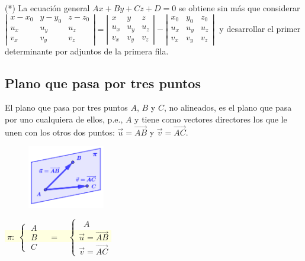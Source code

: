 \vspace{1mm} \noindent (*) \small{\textcolor{gris}{La ecuación general $Ax+By+Cz+D=0$ se obtiene sin más que considerar $\left| \begin{matrix} x-x_0&y-y_0&z-z_0\\u_x&u_y&u_z\\v_x&v_y&v_z  \end{matrix} \right|=\left| \begin{matrix} x&y&z\\u_x&u_y&u_z\\v_x&v_y&v_z  \end{matrix} \right|-\left| \begin{matrix} x_0&y_0&z_0\\u_x&u_y&u_z\\v_x&v_y&v_z  \end{matrix} \right|\;$ y desarrollar el primer determinante por adjuntos de la primera fila}}\normalsize{.}

\subsection{Plano que pasa por tres puntos}

El plano que pasa por tres puntos $A$, $B$ y $C$, no alineados, es el plano que pasa por uno cualquiera de ellos, p.e., $A$ y tiene como vectores directores los que le unen con los otros dos puntos: $\vec u=\overrightarrow{AB}$ y $\vec v=\overrightarrow{AC}$.

\begin{multicols}{2}

\begin{figure}[H]
		\centering
		\includegraphics[width=0.3\textwidth]{imagenes/imagenes10/T10IM00P.png}
	\end{figure}
	
\centerline{\colorbox{LightYellow}{$\; \pi:\; \begin{cases} \; A\\ \;B \\ \; C \end{cases} \quad = \quad  \begin{cases} \;\;A \\ \vec u=\overrightarrow{AB} \\ \vec v=\overrightarrow{AC} \end{cases}$}}

	
\end{multicols}


